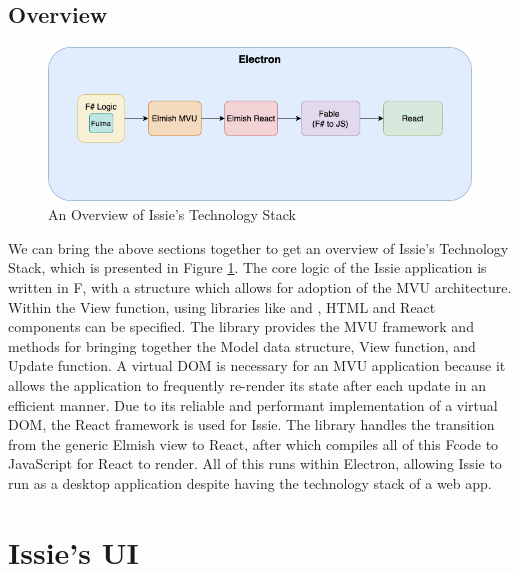 \subsection{Overview}
\begin{figure} [h]
    \centering
    \includegraphics[width=\textwidth]{02.Background/Stack.png}
    \caption{An Overview of Issie's Technology Stack}
    \label{fig:techstack}
\end{figure}
We can bring the above sections together to get an overview of Issie's Technology Stack, which is presented in Figure \ref{fig:techstack}. The core logic of the Issie application is written in F\fsharp, with a structure which allows for adoption of the MVU architecture. Within the View function, using libraries like  and , HTML and React components can be specified. The  library provides the MVU framework and methods for bringing together the Model data structure, View function, and Update function. A virtual DOM is necessary for an MVU application because it allows the application to frequently re-render its state after each update in an efficient manner. Due to its reliable and performant implementation of a virtual DOM, the React framework is used for Issie. The library  handles the transition from the generic Elmish view to React, after which  compiles all of this F\fsharp code to JavaScript for React to render. All of this runs within Electron, allowing Issie to run as a desktop application despite having the technology stack of a web app.

\section{Issie's UI} \label{sec:IssieUI}
